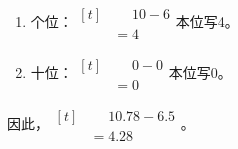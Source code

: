 {\begin{enumerate}[leftmargin=1.7em,itemsep=5pt,topsep=0pt]
\item 个位：\(\begin{aligned}[t]&\phantom{={}}10-6\\&=4\end{aligned}\)\quad 本位写4。
\item 十位：\(\begin{aligned}[t]&\phantom{={}}0-0\\&=0\end{aligned}\)\quad 本位写0。
\end{enumerate}
\par\smallskip
因此，\(\begin{aligned}[t]&\phantom{={}}10.78-6.5\\&=4.28\end{aligned}\)。
\par\medskip

}
